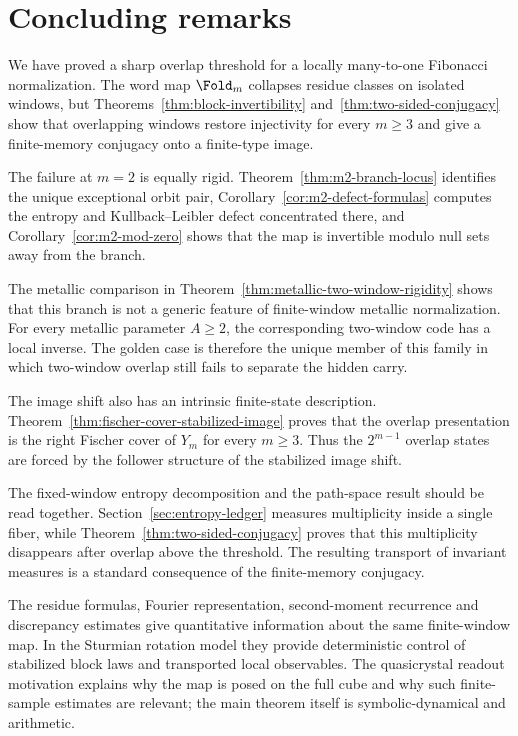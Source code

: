 \section{Concluding remarks}\label{sec:discussion}

We have proved a sharp overlap threshold for a locally many-to-one Fibonacci normalization. The word map $\Fold_m$ collapses residue classes on isolated windows, but Theorems~\ref{thm:block-invertibility} and~\ref{thm:two-sided-conjugacy} show that overlapping windows restore injectivity for every $m\ge3$ and give a finite-memory conjugacy onto a finite-type image.

The failure at $m=2$ is equally rigid. Theorem~\ref{thm:m2-branch-locus} identifies the unique exceptional orbit pair, Corollary~\ref{cor:m2-defect-formulas} computes the entropy and Kullback--Leibler defect concentrated there, and Corollary~\ref{cor:m2-mod-zero} shows that the map is invertible modulo null sets away from the branch.

The metallic comparison in Theorem~\ref{thm:metallic-two-window-rigidity} shows that this branch is not a generic feature of finite-window metallic normalization. For every metallic parameter $A\ge2$, the corresponding two-window code has a local inverse. The golden case is therefore the unique member of this family in which two-window overlap still fails to separate the hidden carry.

The image shift also has an intrinsic finite-state description. Theorem~\ref{thm:fischer-cover-stabilized-image} proves that the overlap presentation is the right Fischer cover of $Y_m$ for every $m\ge3$. Thus the $2^{m-1}$ overlap states are forced by the follower structure of the stabilized image shift.

The fixed-window entropy decomposition and the path-space result should be read together. Section~\ref{sec:entropy-ledger} measures multiplicity inside a single fiber, while Theorem~\ref{thm:two-sided-conjugacy} proves that this multiplicity disappears after overlap above the threshold. The resulting transport of invariant measures is a standard consequence of the finite-memory conjugacy.

The residue formulas, Fourier representation, second-moment recurrence and discrepancy estimates give quantitative information about the same finite-window map. In the Sturmian rotation model they provide deterministic control of stabilized block laws and transported local observables. The quasicrystal readout motivation explains why the map is posed on the full cube and why such finite-sample estimates are relevant; the main theorem itself is symbolic-dynamical and arithmetic.
